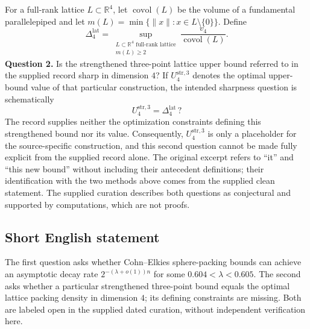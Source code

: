 \documentclass[11pt]{article}
\newcommand{\R}{\mathbb{R}}
\begin{document}
For a full-rank lattice \(L\subset\R^4\), let \(\operatorname{covol}(L)\) be the volume of a fundamental parallelepiped and let \(m(L)=\min\{\|x\|:x\in L\setminus\{0\}\}\). Define
\[
\Delta_4^{\mathrm{lat}}=\sup_{\substack{L\subset\R^4\text{ full-rank lattice}\\m(L)\geq 2}}\frac{v_4}{\operatorname{covol}(L)}.
\]
\textbf{Question 2.} Is the strengthened three-point lattice upper bound referred to in the supplied record sharp in dimension \(4\)? If \(U_4^{\mathrm{str},3}\) denotes the optimal upper-bound value of that particular construction, the intended sharpness question is schematically
\[
U_4^{\mathrm{str},3}=\Delta_4^{\mathrm{lat}}\,?
\]
The record supplies neither the optimization constraints defining this strengthened bound nor its value. Consequently, \(U_4^{\mathrm{str},3}\) is only a placeholder for the source-specific construction, and this second question cannot be made fully explicit from the supplied record alone. The original excerpt refers to ``it'' and ``this new bound'' without including their antecedent definitions; their identification with the two methods above comes from the supplied clean statement. The supplied curation describes both questions as conjectural and supported by computations, which are not proofs.
\subsection{Short English statement}
The first question asks whether Cohn--Elkies sphere-packing bounds can achieve an asymptotic decay rate \(2^{-(\lambda+o(1))n}\) for some \(0.604<\lambda<0.605\). The second asks whether a particular strengthened three-point bound equals the optimal lattice packing density in dimension \(4\); its defining constraints are missing. Both are labeled open in the supplied dated curation, without independent verification here.
\end{document}
